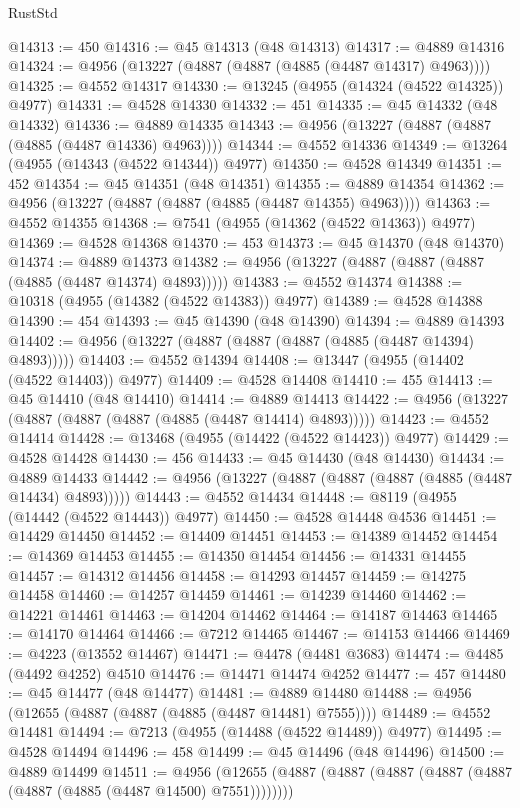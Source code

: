 \begin{lexlean}{RustStd}
\begin{coremodule}
@14313 := 450
@14316 := @45 @14313 (@48 @14313)
@14317 := @4889 @14316
@14324 := @4956 (@13227 (@4887 (@4887 (@4885 (@4487 @14317) @4963))))
@14325 := @4552 @14317
@14330 := @13245 (@4955 (@14324 (@4522 @14325)) @4977)
@14331 := @4528 @14330
@14332 := 451
@14335 := @45 @14332 (@48 @14332)
@14336 := @4889 @14335
@14343 := @4956 (@13227 (@4887 (@4887 (@4885 (@4487 @14336) @4963))))
@14344 := @4552 @14336
@14349 := @13264 (@4955 (@14343 (@4522 @14344)) @4977)
@14350 := @4528 @14349
@14351 := 452
@14354 := @45 @14351 (@48 @14351)
@14355 := @4889 @14354
@14362 := @4956 (@13227 (@4887 (@4887 (@4885 (@4487 @14355) @4963))))
@14363 := @4552 @14355
@14368 := @7541 (@4955 (@14362 (@4522 @14363)) @4977)
@14369 := @4528 @14368
@14370 := 453
@14373 := @45 @14370 (@48 @14370)
@14374 := @4889 @14373
@14382 := @4956 (@13227 (@4887 (@4887 (@4887 (@4885 (@4487 @14374) @4893)))))
@14383 := @4552 @14374
@14388 := @10318 (@4955 (@14382 (@4522 @14383)) @4977)
@14389 := @4528 @14388
@14390 := 454
@14393 := @45 @14390 (@48 @14390)
@14394 := @4889 @14393
@14402 := @4956 (@13227 (@4887 (@4887 (@4887 (@4885 (@4487 @14394) @4893)))))
@14403 := @4552 @14394
@14408 := @13447 (@4955 (@14402 (@4522 @14403)) @4977)
@14409 := @4528 @14408
@14410 := 455
@14413 := @45 @14410 (@48 @14410)
@14414 := @4889 @14413
@14422 := @4956 (@13227 (@4887 (@4887 (@4887 (@4885 (@4487 @14414) @4893)))))
@14423 := @4552 @14414
@14428 := @13468 (@4955 (@14422 (@4522 @14423)) @4977)
@14429 := @4528 @14428
@14430 := 456
@14433 := @45 @14430 (@48 @14430)
@14434 := @4889 @14433
@14442 := @4956 (@13227 (@4887 (@4887 (@4887 (@4885 (@4487 @14434) @4893)))))
@14443 := @4552 @14434
@14448 := @8119 (@4955 (@14442 (@4522 @14443)) @4977)
@14450 := @4528 @14448 @4536
@14451 := @14429 @14450
@14452 := @14409 @14451
@14453 := @14389 @14452
@14454 := @14369 @14453
@14455 := @14350 @14454
@14456 := @14331 @14455
@14457 := @14312 @14456
@14458 := @14293 @14457
@14459 := @14275 @14458
@14460 := @14257 @14459
@14461 := @14239 @14460
@14462 := @14221 @14461
@14463 := @14204 @14462
@14464 := @14187 @14463
@14465 := @14170 @14464
@14466 := @7212 @14465
@14467 := @14153 @14466
@14469 := @4223 (@13552 @14467)
@14471 := @4478 (@4481 @3683)
@14474 := @4485 (@4492 @4252) @4510
@14476 := @14471 @14474 @4252
@14477 := 457
@14480 := @45 @14477 (@48 @14477)
@14481 := @4889 @14480
@14488 := @4956 (@12655 (@4887 (@4887 (@4885 (@4487 @14481) @7555))))
@14489 := @4552 @14481
@14494 := @7213 (@4955 (@14488 (@4522 @14489)) @4977)
@14495 := @4528 @14494
@14496 := 458
@14499 := @45 @14496 (@48 @14496)
@14500 := @4889 @14499
@14511 := @4956
    (@12655 (@4887 (@4887 (@4887 (@4887 (@4887 (@4887 (@4885 (@4487 @14500) @7551))))))))

\end{coremodule}
\end{lexlean}
